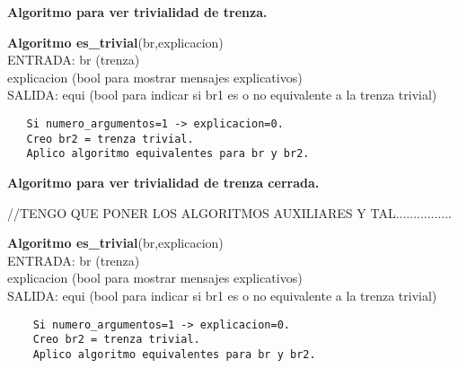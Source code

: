 \bigskip
\begin{center}
	\textbf{Algoritmo para ver trivialidad de trenza.}
\end{center} 

\begin{alg}
	\textbf{Algoritmo es\_trivial}(br,explicacion)\\
	ENTRADA: br (trenza)\\
	\hspace*{2.2cm} explicacion (bool para mostrar mensajes explicativos)\\
	SALIDA: \hspace{0.4cm} equi (bool para indicar si br1 es o no equivalente a la trenza trivial)
	
\begin{lstlisting}
   Si numero_argumentos=1 -> explicacion=0.
   Creo br2 = trenza trivial. 
   Aplico algoritmo equivalentes para br y br2.
\end{lstlisting}
\end{alg}

\newpage
\begin{center}
	\textbf{Algoritmo para ver trivialidad de trenza cerrada.}
\end{center} 

//TENGO QUE PONER LOS ALGORITMOS AUXILIARES Y TAL................
\begin{alg}
	\textbf{Algoritmo es\_trivial}(br,explicacion)\\
	ENTRADA: br (trenza)\\
	\hspace*{2.2cm} explicacion (bool para mostrar mensajes explicativos)\\
	SALIDA: \hspace{0.4cm} equi (bool para indicar si br1 es o no equivalente a la trenza trivial)
	
	\begin{lstlisting}
	Si numero_argumentos=1 -> explicacion=0.
	Creo br2 = trenza trivial. 
	Aplico algoritmo equivalentes para br y br2.
	\end{lstlisting}
\end{alg}